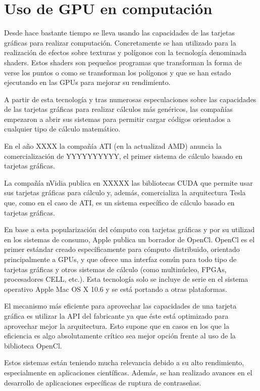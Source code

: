 \section{Uso de GPU en computación}

Desde hace bastante tiempo se lleva usando las capacidades de las tarjetas gráficas para realizar computación. Concretamente se han utilizado para la realización de efectos sobre texturas y polígonos con la tecnología denominada shaders. Estos shaders son pequeños programas que transforman la forma de verse los puntos o como se transforman los polígonos y que se han estado ejecutando en las GPUs para mejorar su rendimiento.

A partir de esta tecnología y tras numerosas especulaciones sobre las capacidades de las tarjetas gráficas para realizar cálculos más genéricos, las compañías empezaron a abrir sus sistemas para permitir cargar códigos orientados a cualquier tipo de cálculo matemático.

En el año XXXX la compañía ATI (en la actualizad AMD) anuncia la comercialización de YYYYYYYYYY, el primer sistema de cálculo basado en tarjetas gráficas.

La compañía nVidia publica en XXXXX las bibliotecas CUDA que permite usar sus tarjetas gráficas para cálculo y, además, comercializa la arquitectura Tesla que, como en el caso de ATI, es un sistema específico de cálculo basado en tarjetas gráficas.

En base a esta popularización del cómputo con tarjetas gráficas y por  su utilizad en los sistemas  de consumo, Apple publica un borrador de OpenCl. OpenCl es  el primer estándar creado específicamente para cómputo distribuido, orientado principalmente a GPUs, y que ofrece una interfaz común para todo tipo de tarjetas gráficas y otros sistemas de cálculo (como multinúcleo, FPGAs, procesadores CELL, etc.). Esta tecnología solo se incluye de serie en el sistema operativo Apple Mac OS X 10.6 y se está portando a otras plataformas.

El mecanismo más eficiente para aprovechar las capacidades de una tarjeta gráfica es utilizar la API del fabricante ya que éste está optimizado para aprovechar mejor la arquitectura. Esto supone que en casos en los que la eficiencia es algo absolutamente crítico sea mejor opción frente al uso de la biblioteca OpenCl.

Estos sistemas están teniendo mucha relevancia debido a su alto rendimiento, especialmente en aplicaciones científicas. Además, se han realizado avances en el desarrollo de aplicaciones específicas de ruptura de contraseñas.

